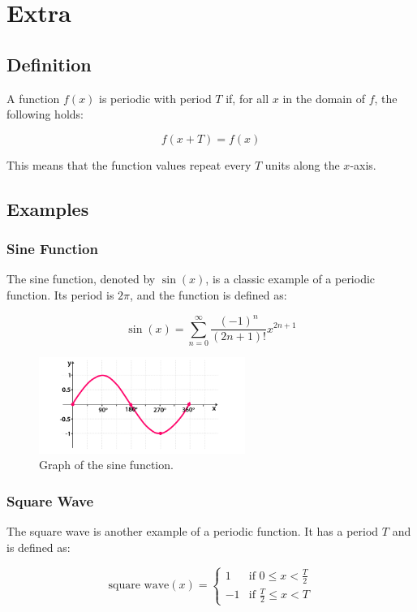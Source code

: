 \documentclass{article}
\begin{document}
\newpage
\section{Extra}
\subsection{Definition}

A function $f(x)$ is periodic with period $T$ if, for all $x$ in the domain of $f$, the following holds:

\[
f(x + T) = f(x)
\]

This means that the function values repeat every $T$ units along the $x$-axis.

\subsection{Examples}

\subsubsection{Sine Function}

\begin{tcolorbox}[mybox]
    The sine function, denoted by $\sin(x)$, is a classic example of a periodic function. Its period is $2\pi$, and the function is defined as:
    
    \[
    \sin(x) = \sum_{n=0}^{\infty} \frac{(-1)^n}{(2n+1)!} x^{2n+1}
    \]
\end{tcolorbox}

\begin{figure}[h]
    \centering
    \includegraphics[width=0.6\textwidth]{Unit 6/Sine-Graph.png}
    \caption{Graph of the sine function.}
\end{figure}
\newpage 
\subsubsection{Square Wave}

\begin{tcolorbox}[mybox]
    The square wave is another example of a periodic function. It has a period $T$ and is defined as:
    
    \[
    \text{square wave}(x) = 
    \begin{cases} 
    1 & \text{if } 0 \leq x < \frac{T}{2} \\
    -1 & \text{if } \frac{T}{2} \leq x < T
    \end{cases}
    \]
\end{tcolorbox}
\end{document}
